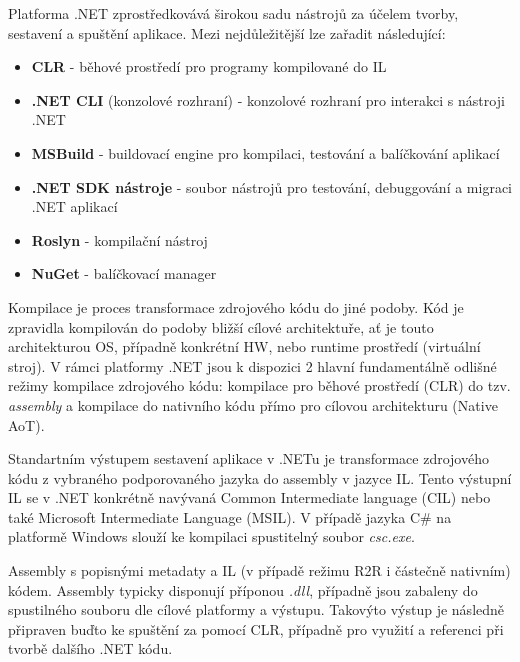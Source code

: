 
Platforma .NET zprostředkovává širokou sadu nástrojů za účelem tvorby, sestavení a spuštění aplikace. Mezi nejdůležitější lze zařadit následující:

\begin{itemize}
    \item \textbf{CLR} - běhové prostředí pro programy kompilované do IL
    \item \textbf{.NET CLI} (konzolové rozhraní) - konzolové rozhraní pro interakci s nástroji .NET
    \item \textbf{MSBuild} - buildovací engine pro kompilaci, testování a balíčkování aplikací
    \item \textbf{.NET SDK nástroje} - soubor nástrojů pro testování, debuggování a migraci .NET aplikací
    \item \textbf{Roslyn} - kompilační nástroj
    \item \textbf{NuGet} - balíčkovací manager 
\end{itemize}


Kompilace je proces transformace zdrojového kódu do jiné podoby. Kód je zpravidla kompilován do podoby bližší cílové architektuře, ať je touto architekturou OS, případně konkrétní HW, nebo runtime prostředí (virtuální stroj). V rámci platformy .NET jsou k dispozici 2 hlavní fundamentálně odlišné režimy kompilace zdrojového kódu: kompilace pro běhové prostředí (CLR) do tzv. \emph{assembly} a kompilace do nativního kódu přímo pro cílovou architekturu (Native AoT).


Standartním výstupem sestavení aplikace v .NETu je transformace zdrojového kódu z vybraného podporovaného jazyka do assembly v jazyce IL. Tento výstupní IL se v .NET konkrétně navývaná Common Intermediate language (CIL) nebo také Microsoft Intermediate Language (MSIL). V případě jazyka C\# na platformě Windows slouží ke kompilaci spustitelný soubor \emph{csc.exe}. 


Assembly s popisnými metadaty a IL (v případě režimu R2R i částečně nativním) kódem. Assembly typicky disponují příponou \emph{.dll}, případně jsou zabaleny do spustilného souboru dle cílové platformy a výstupu. Takovýto výstup je následně připraven buďto ke spuštění za pomocí CLR, případně pro využití a referenci při tvorbě dalšího .NET kódu.

